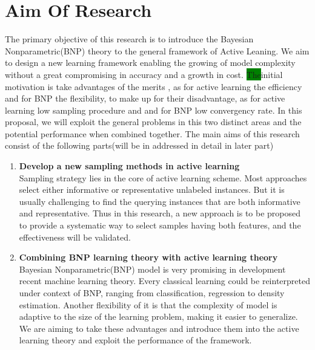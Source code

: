 \section{Aim Of Research}\label{aor}
The primary objective of this research is to introduce the Bayesian Nonparametric(BNP) theory to the general framework of Active Leaning. We aim to design a new learning framework enabling the growing of model complexity without a great compromising in accuracy and a growth in cost.
\colorbox{green}{The}initial motivation is take advantages of the merits , as for active learning the efficiency and for BNP the flexibility, to make up for their disadvantage, as for active learning low sampling procedure and and for BNP low convergency rate\cite{gershman2012tutorial,escobar1995bayesian,Settles2010}. In this proposal, we will exploit the general problems in this two distinct areas and the  potential performance when combined together.  The main aims of this research consist of the following parts(will be in addressed in detail in later part) 
\begin{enumerate}
\item{\textbf{Develop a new sampling methods in active learning}}\\
 Sampling strategy lies in the core of active learning scheme. Most approaches select either informative or representative unlabeled instances. But it is usually challenging to find the querying instances that are both informative and representative. Thus in this research, a new approach is to be proposed to provide a systematic way to select samples having both features, and the effectiveness will be validated.
 
\item{\textbf{Combining BNP learning theory with active learning theory  }}\\

 Bayesian Nonparametric(BNP) model is very promising in development recent machine learning theory. Every classical learning could be reinterpreted under context of BNP, ranging from classification, regression to density estimation. Another flexibility of it is that the complexity of model is adaptive to the size of the learning problem, making it easier to generalize. We are aiming to take these advantages and introduce them into the active learning theory and exploit the performance of the framework.  
\end{enumerate}


